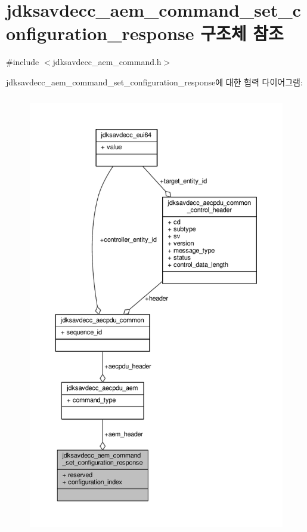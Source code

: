 \hypertarget{structjdksavdecc__aem__command__set__configuration__response}{}\section{jdksavdecc\+\_\+aem\+\_\+command\+\_\+set\+\_\+configuration\+\_\+response 구조체 참조}
\label{structjdksavdecc__aem__command__set__configuration__response}


{\ttfamily \#include $<$jdksavdecc\+\_\+aem\+\_\+command.\+h$>$}



jdksavdecc\+\_\+aem\+\_\+command\+\_\+set\+\_\+configuration\+\_\+response에 대한 협력 다이어그램\+:
\nopagebreak
\begin{figure}[H]
\begin{center}
\leavevmode
\includegraphics[height=550pt]{structjdksavdecc__aem__command__set__configuration__response__coll__graph}
\end{center}
\end{figure}
